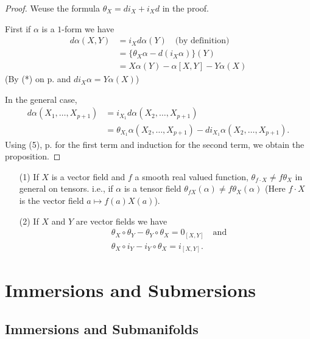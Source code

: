 \begin{proof}
We\pageoriginale use the formula $\theta_{X}=di_{X}+i_{X}d$ in the proof.

First if $\alpha$ is a $1$-form we have
\begin{align*}
d\alpha(X,Y) &= i_{X}d\alpha(Y)\quad \text{(by definition)}\\[3pt]
             &= \{\theta_{X}\alpha-d(i_{X}\alpha)\}(Y)\\[3pt]
             &= X\alpha(Y)-\alpha[X,Y]-Y\alpha(X)
\end{align*}
(By (*) on p.\pageref{page28} and $di_{X}\alpha=Y\alpha(X)$)

In the general case,
\begin{align*}
d\alpha(X_{1},\ldots,X_{p+1}) &= i_{X_{1}}d\alpha(X_{2},\ldots,X_{p+1})\\[3pt]
                            &= \theta_{X_{1}}\alpha(X_{2},\ldots,X_{p+1})-di_{X_{1}}\alpha(X_{2},\ldots,X_{p+1}).
\end{align*}
Using (5), p.\pageref{page27} for the first term and induction for the second term, we obtain the proposition.
\end{proof}

\begin{remarks*}
\begin{itemize}
\item[(1)] If $X$ is a vector field and $f$ a smooth real valued function, $\theta_{f\cdot X}\neq f\theta_{X}$ in general on tensors. i.e., if $\alpha$ is a tensor field $\theta_{fX}(\alpha)\neq f\theta_{X}(\alpha)$ (Here $f\cdot X$ is the vector field $a\mapsto f(a)X(a)$).

\item[(2)] If $X$ and $Y$ are vector fields we have
\begin{align*}
& \theta_{X}\circ \theta_{Y}-\theta_{Y}\circ \theta_{X}=0_{[X,Y]}\quad\text{and}\\[3pt]
& \theta_{X}\circ i_{Y}-i_{Y}\circ \theta_{X}=i_{[X,Y]}.
\end{align*}
\end{itemize}
\end{remarks*}

\section{Immersions and Submersions}\label{sec7}

\subsection*{Immersions and Submanifolds}

